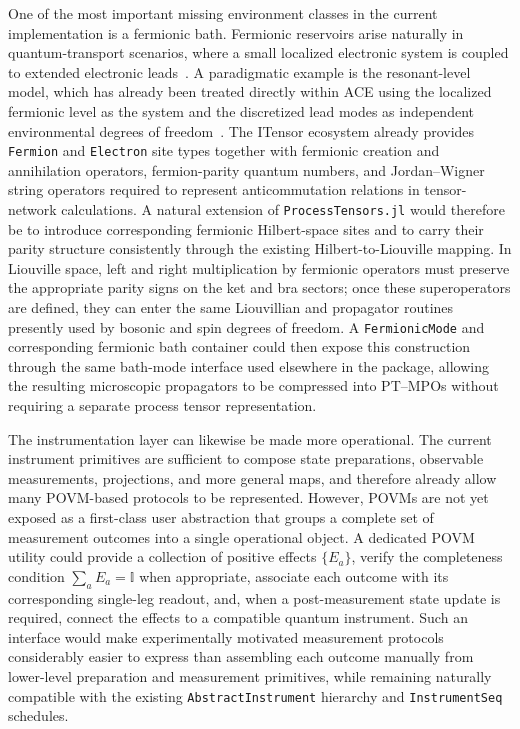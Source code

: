 One of the most important missing environment classes in the current implementation is a fermionic bath. 
Fermionic reservoirs arise naturally in quantum-transport scenarios, where a small localized electronic system is coupled to extended electronic leads~\cite{meir1992landauer,wojtowicz2021extended,nusseler2020fermionic,bulla2008nrg,cirio2023pseudofermion,landi2022boundary}.
A paradigmatic example is the resonant-level model, which has already been treated directly within ACE using the localized fermionic level as the system and the discretized lead modes as independent environmental degrees of freedom~\cite{Cygorek2022}.
The ITensor ecosystem already provides \texttt{Fermion} and \texttt{Electron} site types together with fermionic creation and annihilation operators, fermion-parity quantum numbers, and Jordan--Wigner string operators required to represent anticommutation relations in tensor-network calculations.
A natural extension of \texttt{ProcessTensors.jl} would therefore be to introduce corresponding fermionic Hilbert-space sites and to carry their parity structure consistently through the existing Hilbert-to-Liouville mapping.
In Liouville space, left and right multiplication by fermionic operators must preserve the appropriate parity signs on the ket and bra sectors; once these superoperators are defined, they can enter the same Liouvillian and propagator routines presently used by bosonic and spin degrees of freedom.
A \texttt{FermionicMode} and corresponding fermionic bath container could then expose this construction through the same bath-mode interface used elsewhere in the package, allowing the resulting microscopic propagators to be compressed into PT--MPOs without requiring a separate process tensor representation.

The instrumentation layer can likewise be made more operational.
The current instrument primitives are sufficient to compose state preparations, observable measurements, projections, and more general maps, and therefore already allow many POVM-based protocols to be represented.
However, POVMs are not yet exposed as a first-class user abstraction that groups a complete set of measurement outcomes into a single operational object.
A dedicated POVM utility could provide a collection of positive effects \(\{E_a\}\), verify the completeness condition \(\sum_a E_a=\mathbb{I}\) when appropriate, associate each outcome with its corresponding single-leg readout, and, when a post-measurement state update is required, connect the effects to a compatible quantum instrument.
Such an interface would make experimentally motivated measurement protocols considerably easier to express than assembling each outcome manually from lower-level preparation and measurement primitives, while remaining naturally compatible with the existing \texttt{AbstractInstrument} hierarchy and \texttt{InstrumentSeq} schedules.

